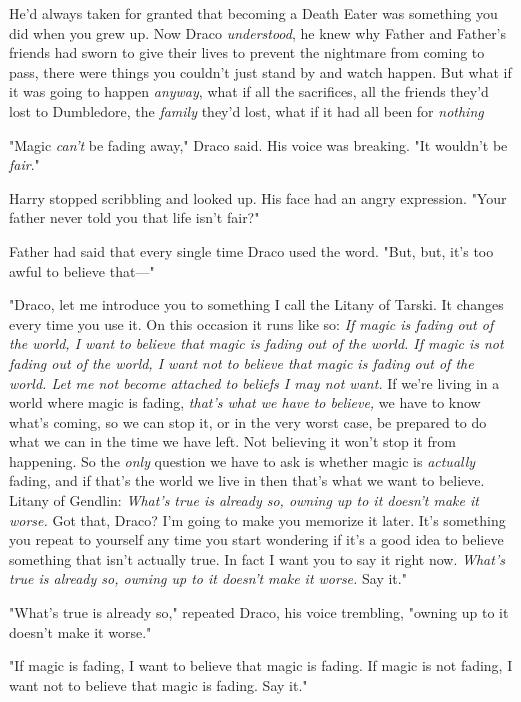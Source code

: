 He'd always taken for granted that becoming a Death Eater was something you did
when you grew up. Now Draco \emph{understood}, he knew why Father and Father's
friends had sworn to give their lives to prevent the nightmare from coming to
pass, there were things you couldn't just stand by and watch happen. But what
if it was going to happen \emph{anyway}, what if all the sacrifices, all the
friends they'd lost to Dumbledore, the \emph{family} they'd lost, what if it
had all been for \emph{nothing{\el}}

"Magic \emph{can't} be fading away," Draco said. His voice was breaking. "It
wouldn't be \emph{fair}."

Harry stopped scribbling and looked up. His face had an angry expression. "Your
father never told you that life isn't fair?"

Father had said that every single time Draco used the word. "But, but, it's too
awful to believe that\mbox{---}"

"Draco, let me introduce you to something I call the Litany of Tarski. It
changes every time you use it. On this occasion it runs like so: \emph{If magic
is fading out of the world, I want to believe that magic is fading out of the
world. If magic is not fading out of the world, I want not to believe that
magic is fading out of the world. Let me not become attached to beliefs I may
not want.} If we're living in a world where magic is fading, \emph{that's what
we have to believe,} we have to know what's coming, so we can stop it, or in
the very worst case, be prepared to do what we can in the time we have left.
Not believing it won't stop it from happening. So the \emph{only} question we
have to ask is whether magic is \emph{actually} fading, and if that's the world
we live in then that's what we want to believe. Litany of Gendlin: \emph{What's
true is already so, owning up to it doesn't make it worse.} Got that, Draco?
I'm going to make you memorize it later. It's something you repeat to yourself
any time you start wondering if it's a good idea to believe something that
isn't actually true. In fact I want you to say it right now. \emph{What's true
is already so, owning up to it doesn't make it worse.} Say it."

"What's true is already so," repeated Draco, his voice trembling, "owning up to
it doesn't make it worse."

"If magic is fading, I want to believe that magic is fading. If magic is not
fading, I want not to believe that magic is fading. Say it."

